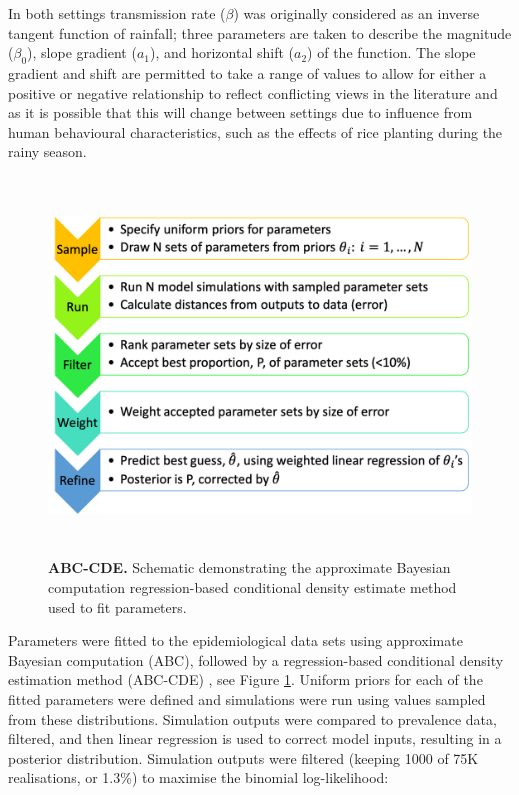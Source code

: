 In both settings transmission rate ($\beta$) was originally considered as an inverse tangent function of rainfall; three parameters are taken to describe the magnitude ($\beta_0$), slope gradient ($a_1$), and horizontal shift ($a_2$) of the function. The slope gradient and shift are permitted to take a range of values to allow for either a positive or negative relationship to reflect conflicting views in the literature and as it is possible that this will change between settings due to influence from human behavioural characteristics, such as the effects of rice planting during the rainy season. 

\begin{figure}[!ht]
\begin{center}
\includegraphics[height=10cm]{Project/Figures/STH/ABCdiag.png}
\caption[ABC-CDE statistical fitting schematic.]{{\bf ABC-CDE.}
Schematic demonstrating the approximate Bayesian computation regression-based conditional density estimate method used to fit parameters.}
\label{fig:ABCdiag}
\end{center}
\end{figure} 

Parameters were fitted to the epidemiological data sets using approximate Bayesian computation (ABC), followed by a regression-based conditional density estimation method (ABC-CDE) \cite{Beaumont}, see Figure \ref{fig:ABCdiag}. Uniform priors for each of the fitted parameters were defined and simulations were run using values sampled from these distributions. Simulation outputs were compared to prevalence data, filtered, and then linear regression is used to correct model inputs, resulting in a posterior distribution. Simulation outputs were filtered (keeping 1000 of 75K realisations, or 1.3\%) to maximise the binomial log-likelihood: 

